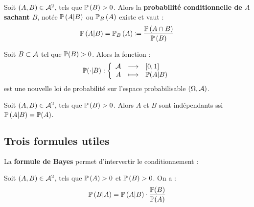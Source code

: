 \documentclass[../integ-proba.tex]{subfiles}
\begin{document}
    \begin{defi}
        Soit $\left( A,B \right) \in \mathcal{A}^2$, tels que $\mathbb{P}\left( B \right) > 0$.
        Alors la \textbf{probabilité conditionnelle de $A$ sachant $B$}, notée $\mathbb{P}\left( A | B \right)$ ou $\mathbb{P}_B\left( A \right)$ existe et vaut :
        \begin{displaymath}
            \mathbb{P}\left( A | B \right) = \mathbb{P}_B\left( A \right) \coloneqq \frac{\mathbb{P}\left( A \cap B \right)}{\mathbb{P}\left( B \right)}
        \end{displaymath}
    \end{defi}

    \begin{prop}
        Soit $B \subset \mathcal{A}$ tel que $\mathbb{P}(B) > 0$.
        Alors la fonction :
        \begin{displaymath}
            \mathbb{P}(\cdot | B) :
            \left\{
            \begin{array}{rcl}
                \mathcal{A} & \longrightarrow & [0,1] \\
                A  & \longmapsto     & \mathbb{P}(A | B)
            \end{array}
            \right.
        \end{displaymath}
        est une nouvelle loi de probabilité sur l'espace probabilisable $\left( \Omega, \mathcal{A} \right)$.
    \end{prop}

    \begin{prop}
        Soit $\left( A,B \right) \in \mathcal{A}^2$, tels que $\mathbb{P}\left( B \right) > 0$.
        Alors $A$ et $B$ sont indépendants ssi $\mathbb{P}\left( A | B \right) = \mathbb{P}(A)$.
    \end{prop}

    \subsection{Trois formules utiles}

    La \textbf{formule de Bayes} permet d'intervertir le conditionnement :

    \begin{thm}
        Soit $\left( A,B \right) \in \mathcal{A}^2$, tels que $\mathbb{P}\left( A \right) > 0$ et $\mathbb{P}\left( B \right) > 0$.
        On a :
        \begin{displaymath}
            \mathbb{P} \left( B | A \right) = \mathbb{P}\left( A | B \right) \cdot \frac{\mathbb{P}(B)}{\mathbb{P}(A)}
        \end{displaymath}
    \end{thm}
\end{document}
